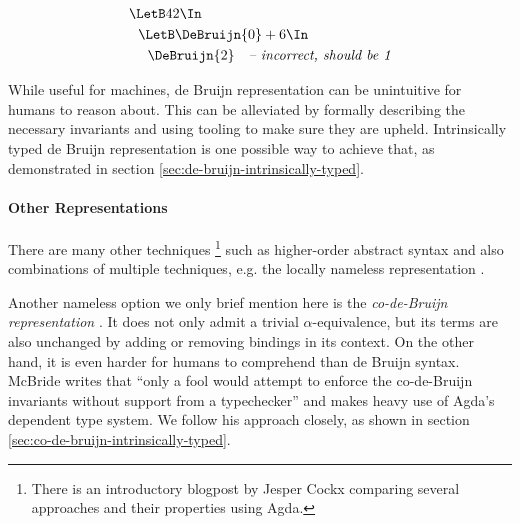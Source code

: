     \begin{align*}
      &\LetB 42 \In                   \\
      &\ \ \LetB \DeBruijn{0} + 6 \In \\
      &\ \ \ \ \DeBruijn{2}\ \ \ \textit{-- incorrect, should be 1}
    \end{align*}

    While useful for machines, de Bruijn representation can be unintuitive
    for humans to reason about.
    This can be alleviated by formally describing the necessary invariants
    and using tooling to make sure they are upheld.
    Intrinsically typed de Bruijn representation is one
    possible way to achieve that, as demonstrated in section
    \ref{sec:de-bruijn-intrinsically-typed}.

  \paragraph{Other Representations}
    There are many other techniques%
    \footnote{
    There is an introductory blogpost by Jesper Cockx
    \cite{Cockx2021RepresentationsBinding}
    comparing several approaches and their properties using Agda.
    }
    such as higher-order abstract syntax
    \cite{Pfenning1988HOAS}
    and also combinations of multiple techniques, e.g. the locally nameless representation
    \cite{Chargueraud2011LocallyNameless}.

    Another nameless option we only brief mention here is the
    \emph{co-de-Bruijn representation}
    \cite{McBride2018EveryBodysGotToBeSomewhere}.
    It does not only admit a trivial $\alpha$-equivalence,
    but its terms are also unchanged by adding or removing bindings
    in its context.
    On the other hand,
    it is even harder for humans to comprehend than de Bruijn syntax.
    McBride writes that
    ``only a fool would attempt to enforce the co-de-Bruijn invariants
    without support from a typechecker''
    and makes heavy use of Agda's dependent type system.
    We follow his approach closely, as shown in section
    \ref{sec:co-de-bruijn-intrinsically-typed}.
